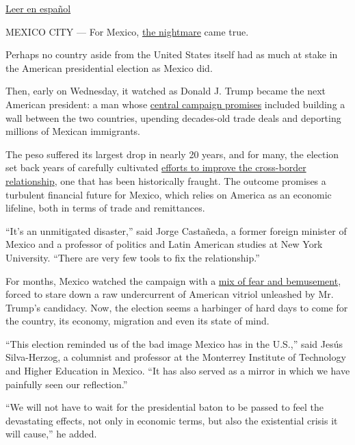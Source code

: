 \href{http://www.nytimes3xbfgragh.onion/es/2016/11/09/mexico-se-prepara-para-los-efectos-de-una-presidencia-de-trump/}{Leer
en español}

MEXICO CITY --- For Mexico,
\href{http://www.nytimes3xbfgragh.onion/2016/05/23/world/americas/donald-trump-mexico.html}{the
nightmare} came true.

Perhaps no country aside from the United States itself had as much at
stake in the American presidential election as Mexico did.

Then, early on Wednesday, it watched as Donald J. Trump became the next
American president: a man whose
\href{http://www.nytimes3xbfgragh.onion/2015/07/03/world/americas/donald-trump-gains-infamy-in-mexico-for-comments-on-immigrants.html}{central
campaign promises} included building a wall between the two countries,
upending decades-old trade deals and deporting millions of Mexican
immigrants.

The peso suffered its largest drop in nearly 20 years, and for many, the
election set back years of carefully cultivated
\href{http://www.nytimes3xbfgragh.onion/2016/09/01/world/americas/trump-mexico-pena-nieto-reaction.html}{efforts
to improve the cross-border relationship}, one that has been
historically fraught. The outcome promises a turbulent financial future
for Mexico, which relies on America as an economic lifeline, both in
terms of trade and remittances.

``It's an unmitigated disaster,'' said Jorge Castañeda, a former foreign
minister of Mexico and a professor of politics and Latin American
studies at New York University. ``There are very few tools to fix the
relationship.''

For months, Mexico watched the campaign with a
\href{http://www.nytimes3xbfgragh.onion/2015/07/03/world/americas/donald-trump-gains-infamy-in-mexico-for-comments-on-immigrants.html}{mix
of fear and bemusement}, forced to stare down a raw undercurrent of
American vitriol unleashed by Mr. Trump's candidacy. Now, the election
seems a harbinger of hard days to come for the country, its economy,
migration and even its state of mind.

``This election reminded us of the bad image Mexico has in the U.S.,''
said Jesús Silva-Herzog, a columnist and professor at the Monterrey
Institute of Technology and Higher Education in Mexico. ``It has also
served as a mirror in which we have painfully seen our reflection.''

``We will not have to wait for the presidential baton to be passed to
feel the devastating effects, not only in economic terms, but also the
existential crisis it will cause,'' he added.


